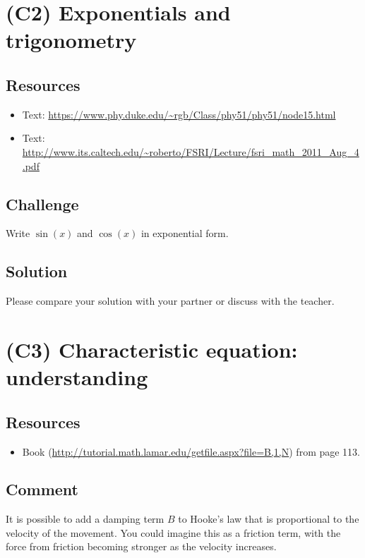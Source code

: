 



\newpage
\section{(C2) Exponentials and trigonometry}

\subsection*{Resources}
\begin{itemize}
    \item Text: \url{https://www.phy.duke.edu/~rgb/Class/phy51/phy51/node15.html}
    \item Text: \url{http://www.its.caltech.edu/~roberto/FSRI/Lecture/fsri_math_2011_Aug_4.pdf}
\end{itemize}

\subsection*{Challenge}
Write $\sin(x)$ and $\cos(x)$ in exponential form.

\subsection*{Solution}
Please compare your solution with your partner or discuss with the teacher.




\newpage
\section{(C3) Characteristic equation: understanding}

\subsection*{Resources}
\begin{itemize}
    \item Book (\url{http://tutorial.math.lamar.edu/getfile.aspx?file=B,1,N}) from page 113.
\end{itemize}

\subsection*{Comment}
It is possible to add a damping term $B$ to Hooke's law that is proportional to the velocity of the movement. You could imagine this as a friction term, with the force from friction becoming stronger as the velocity increases.

